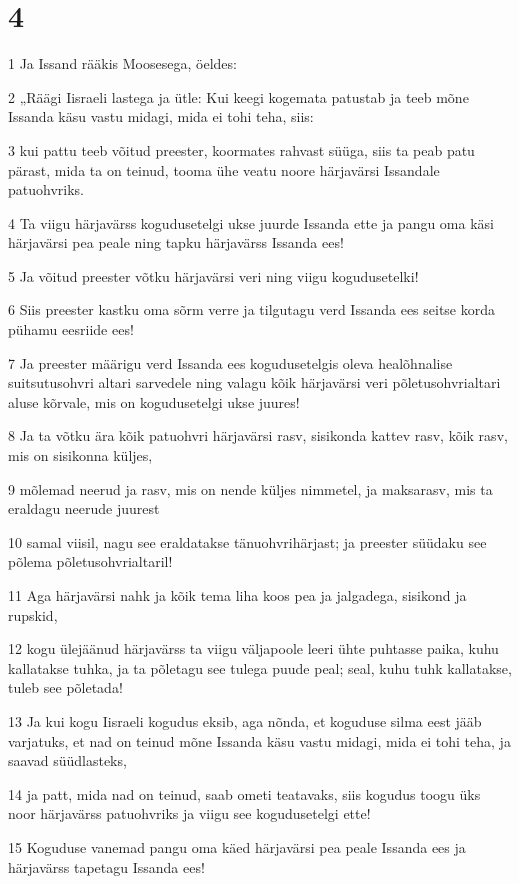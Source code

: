 \chapter{4}

\par 1 Ja Issand rääkis Moosesega, öeldes:
\par 2 „Räägi Iisraeli lastega ja ütle: Kui keegi kogemata patustab ja teeb mõne Issanda käsu vastu midagi, mida ei tohi teha, siis:
\par 3 kui pattu teeb võitud preester, koormates rahvast süüga, siis ta peab patu pärast, mida ta on teinud, tooma ühe veatu noore härjavärsi Issandale patuohvriks.
\par 4 Ta viigu härjavärss kogudusetelgi ukse juurde Issanda ette ja pangu oma käsi härjavärsi pea peale ning tapku härjavärss Issanda ees!
\par 5 Ja võitud preester võtku härjavärsi veri ning viigu kogudusetelki!
\par 6 Siis preester kastku oma sõrm verre ja tilgutagu verd Issanda ees seitse korda pühamu eesriide ees!
\par 7 Ja preester määrigu verd Issanda ees kogudusetelgis oleva healõhnalise suitsutusohvri altari sarvedele ning valagu kõik härjavärsi veri põletusohvrialtari aluse kõrvale, mis on kogudusetelgi ukse juures!
\par 8 Ja ta võtku ära kõik patuohvri härjavärsi rasv, sisikonda kattev rasv, kõik rasv, mis on sisikonna küljes,
\par 9 mõlemad neerud ja rasv, mis on nende küljes nimmetel, ja maksarasv, mis ta eraldagu neerude juurest
\par 10 samal viisil, nagu see eraldatakse tänuohvrihärjast; ja preester süüdaku see põlema põletusohvrialtaril!
\par 11 Aga härjavärsi nahk ja kõik tema liha koos pea ja jalgadega, sisikond ja rupskid,
\par 12 kogu ülejäänud härjavärss ta viigu väljapoole leeri ühte puhtasse paika, kuhu kallatakse tuhka, ja ta põletagu see tulega puude peal; seal, kuhu tuhk kallatakse, tuleb see põletada!
\par 13 Ja kui kogu Iisraeli kogudus eksib, aga nõnda, et koguduse silma eest jääb varjatuks, et nad on teinud mõne Issanda käsu vastu midagi, mida ei tohi teha, ja saavad süüdlasteks,
\par 14 ja patt, mida nad on teinud, saab ometi teatavaks, siis kogudus toogu üks noor härjavärss patuohvriks ja viigu see kogudusetelgi ette!
\par 15 Koguduse vanemad pangu oma käed härjavärsi pea peale Issanda ees ja härjavärss tapetagu Issanda ees!
